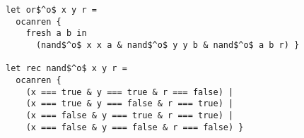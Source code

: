 \begin{lstlisting}
let or$^o$ x y r =
  ocanren {
    fresh a b in
      (nand$^o$ x x a & nand$^o$ y y b & nand$^o$ a b r) }

let rec nand$^o$ x y r =
  ocanren {
    (x === true & y === true & r === false) |
    (x === true & y === false & r === true) |
    (x === false & y === true & r === true) |
    (x === false & y === false & r === false) }
\end{lstlisting}